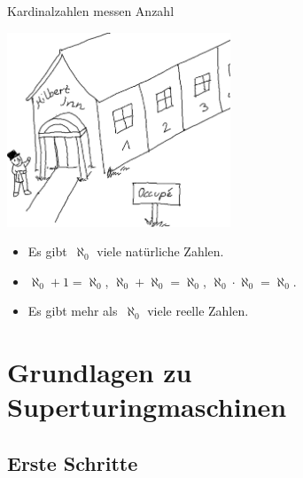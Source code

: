 \documentclass[12pt,compress,ngerman,utf8,t]{beamer}
\begin{document}
\begin{frame}{Kardinalzahlen messen Anzahl}
  \begin{center}
    \includegraphics[width=0.5\textwidth]{images/hilberts-hotel}
  \end{center}

  \begin{itemize}
    \item Es gibt~$\aleph_0$ viele natürliche Zahlen.
    \pause
    \item $\aleph_0 + 1 = \aleph_0$, \quad
    \pause
    $\aleph_0 + \aleph_0 = \aleph_0$, \quad
    \pause
    $\aleph_0 \cdot \aleph_0 = \aleph_0$.
    \pause
    \item Es gibt mehr als~$\aleph_0$ viele reelle Zahlen.
  \end{itemize}
\end{frame}


\section[Grundlagen]{Grundlagen zu Superturingmaschinen}

\subsection{Erste Schritte}
\end{document}
